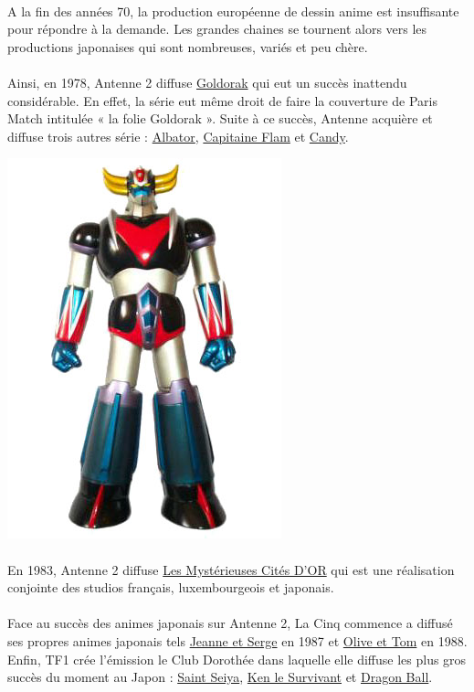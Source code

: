 \paragraph{}
A la fin des années 70, la production européenne de dessin anime est insuffisante pour répondre à la demande. Les grandes chaines se tournent alors vers les productions japonaises qui sont nombreuses, variés et peu chère. 
\paragraph{}
Ainsi, en 1978, Antenne 2 diffuse \underline{Goldorak} qui eut un succès inattendu considérable. En effet, la série eut même droit de faire la couverture de Paris Match intitulée « la folie Goldorak ».  Suite à ce succès, Antenne acquière et diffuse trois autres série : \underline{Albator}, \underline{Capitaine Flam} et \underline{Candy}.
\begin{center}
\includegraphics[scale=0.4]{goldorak.jpg}
\end{center}
\paragraph{}
En 1983, Antenne 2 diffuse \underline{Les Mystérieuses Cités D’OR} qui est une réalisation conjointe des studios français, luxembourgeois et japonais. 
\paragraph{}
Face au succès des animes japonais sur Antenne 2, La Cinq commence a diffusé ses propres animes japonais tels \underline{Jeanne et Serge} en 1987 et \underline{Olive et Tom} en 1988. Enfin, TF1 crée l’émission le Club Dorothée dans laquelle elle diffuse les plus gros succès du moment au Japon : \underline{Saint Seiya}, \underline{Ken le Survivant} et \underline{Dragon Ball}. 

